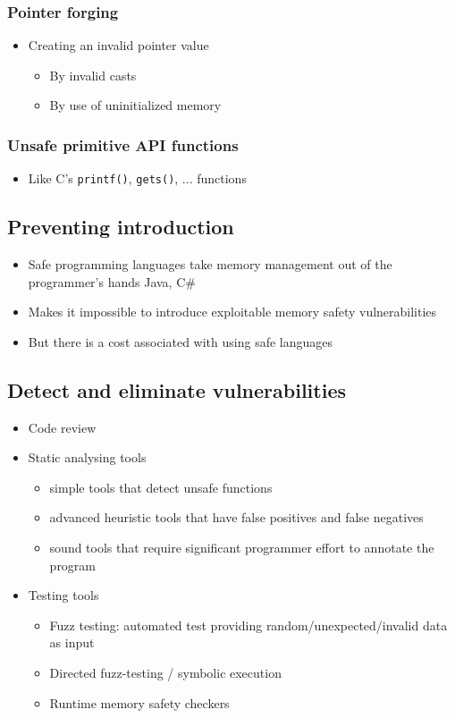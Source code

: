 \documentclass[12pt,titlepage,a4paper]{report}
\begin{document}
	\subsubsection{Pointer forging}
	\begin{itemize}
		\item Creating an invalid pointer value
		\begin{itemize}
			\item By invalid casts
			\item By use of uninitialized memory
		\end{itemize}
	\end{itemize}
	
	\subsubsection{Unsafe primitive API functions}
	\begin{itemize}
		\item Like C's \texttt{printf()}, \texttt{gets()}, ... functions
	\end{itemize}
	
	\subsection{Preventing introduction}
	\begin{itemize}
		\item Safe programming languages take memory management out of the programmer's hands
			\subitem Java, C\#
		\item Makes it impossible to introduce exploitable memory safety vulnerabilities
		\item But there is a cost associated with using safe languages
	\end{itemize}
	
	\subsection{Detect and eliminate vulnerabilities}
	\begin{itemize}
		\item Code review
		\item Static analysing tools
		\begin{itemize}
			\item simple tools that detect unsafe functions
			\item advanced heuristic tools that have false positives and false negatives
			\item sound tools that require significant programmer effort to annotate the program
		\end{itemize}
		\item Testing tools
		\begin{itemize}
			\item Fuzz testing: automated test providing random/unexpected/invalid data as input
			\item Directed fuzz-testing / symbolic execution
			\item Runtime memory safety checkers
		\end{itemize}
	\end{itemize}
	
\end{document}
